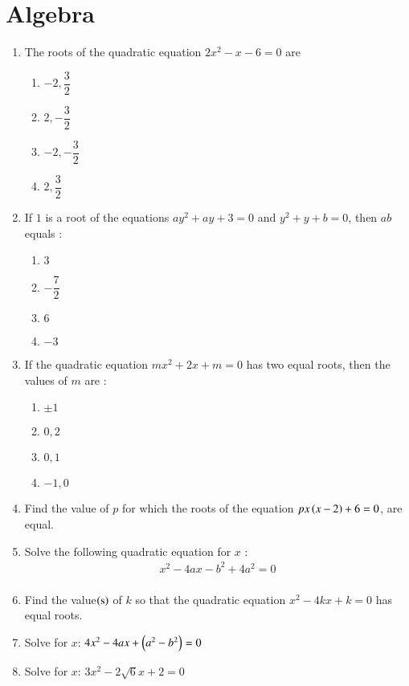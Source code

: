 \documentclass[journal,12pt,onecolumn]{IEEEtran}
\theoremstyle{remark}
\begin{document}
\section{Algebra}
\begin{enumerate}
\item The roots of the quadratic equation  $2x^2 - x - 6 = 0$ are\\
\begin{enumerate}
\item $-2,\dfrac{3}{2}$\\
\item $2,-\dfrac{3}{2}$\\
\item $-2,-\dfrac{3}{2}$\\
\item $2,\dfrac{3}{2}$\\
\end{enumerate}
\item If $1$ is a root of the equations $ay^2 + ay + 3 = 0$ and $y^2 + y + b = 0$, then $ab$ equals :\\
\begin{enumerate}
\item $3$\\
\item $-\dfrac{7}{2}$\\
\item $6$\\
\item $-3$\\
\end{enumerate}
\item If the quadratic equation $mx^2 + 2x + m = 0$ has two equal roots, then the values of $m$ are :\\
\begin{enumerate}
\item $\pm 1$\\
\item $0,2$\\
\item $0,1$\\
\item $-1,0$\\
\end{enumerate}
\item Find the value of $p$ for which the roots of the equation $px\left(x-2\right) + 6 = 0$, are equal.\\
\item Solve the following quadratic equation for $x$ :\\
\begin{align}
x^2 - 4 a x - b^2 + 4a^2 = 0\\
\end{align}
\item Find the value$\left(\text{s}\right)$ of $k$ so that the quadratic equation $x^2 - 4kx + k = 0$ has equal roots.\\
\item Solve for $x$: $4x^2 - 4ax + \left(a^2 - b^2\right) = 0$\\
\item Solve for $x$: $3x^2 - 2\sqrt 6 x + 2 = 0$\\


\end{enumerate}
\end{document}

